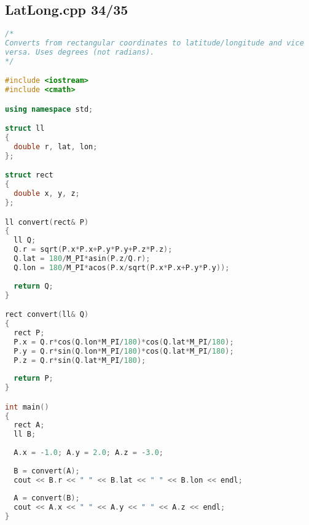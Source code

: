\subsection{LatLong.cpp 34/35}
\begin{lstlisting}[language=C++]
/*
Converts from rectangular coordinates to latitude/longitude and vice
versa. Uses degrees (not radians).
*/

#include <iostream>
#include <cmath>

using namespace std;

struct ll
{
  double r, lat, lon;
};

struct rect
{
  double x, y, z;
};

ll convert(rect& P)
{
  ll Q;
  Q.r = sqrt(P.x*P.x+P.y*P.y+P.z*P.z);
  Q.lat = 180/M_PI*asin(P.z/Q.r);
  Q.lon = 180/M_PI*acos(P.x/sqrt(P.x*P.x+P.y*P.y));
  
  return Q;
}

rect convert(ll& Q)
{
  rect P;
  P.x = Q.r*cos(Q.lon*M_PI/180)*cos(Q.lat*M_PI/180);
  P.y = Q.r*sin(Q.lon*M_PI/180)*cos(Q.lat*M_PI/180);
  P.z = Q.r*sin(Q.lat*M_PI/180);
  
  return P;
}

int main()
{
  rect A;
  ll B;
  
  A.x = -1.0; A.y = 2.0; A.z = -3.0;
  
  B = convert(A);
  cout << B.r << " " << B.lat << " " << B.lon << endl;
  
  A = convert(B);
  cout << A.x << " " << A.y << " " << A.z << endl;
}

\end{lstlisting}